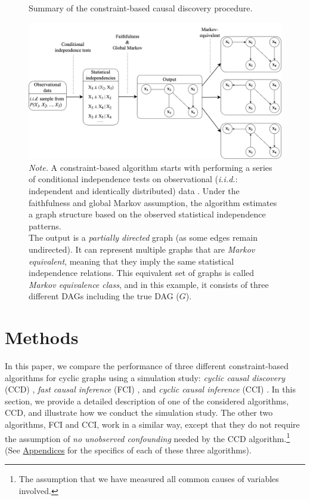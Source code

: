 \documentclass[11pt]{article}
\begin{document}
\vspace{1cm}

\begin{figure}[H]
    \centering
        \caption{Summary of the constraint-based causal discovery procedure.}
        \includegraphics[width=1.0\textwidth]{figures/CB_summaryedited2.png}
        \vspace{0.1mm}
        \caption*{\small{\textit{Note.} A constraint-based algorithm starts with performing a series of conditional independence tests on observational (\textit{i.i.d.}: independent and identically distributed) data . Under the faithfulness and global Markov assumption, the algorithm estimates a graph structure based on the observed statistical independence patterns. \\The output is a \textit{partially directed} graph (as some edges remain undirected). It can represent multiple graphs that are \textit{Markov equivalent}, meaning that they imply the same statistical independence relations. This equivalent set of graphs is called \textit{Markov equivalence class}, and in this example, it consists of three different DAGs including the true DAG ($G$).}}
    \label{fig:3}
\end{figure}

\clearpage
\restoregeometry

\newpage
\section{Methods}
In this paper, we compare the performance of three different constraint-based algorithms for cyclic graphs using a simulation study: \textit{cyclic causal discovery} (CCD) \citep{Richardson1996a}, \textit{fast causal inference} (FCI) \citep{mooij_classen2020}, and \textit{cyclic causal inference} (CCI) \citep{strobl2019}. In this section, we provide a detailed description of one of the considered algorithms, CCD, and illustrate how we conduct the simulation study. The other two algorithms, FCI and CCI, work in a similar way, except that they do not require the assumption of \textit{no unobserved confounding} needed by the CCD algorithm.\footnote{The assumption that we have measured all common causes of variables involved.} (See \hyperref[algCCD]{Appendices} for the specifics of each of these three algorithms).
\end{document}

